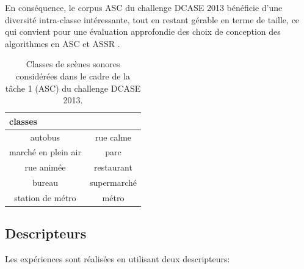 En conséquence, le corpus ASC du challenge DCASE 2013 bénéficie d'une diversité intra-classe intéressante, tout en restant gérable en terme de taille, ce qui convient pour une évaluation approfondie des choix de conception des algorithmes en ASC et ASSR \citep{lagrange2015bag}.

\begin{table}[t]
\centering
\begin{tabular}{cc}
\multicolumn{2}{l}{classes} \\
\hline 
autobus             & rue calme \\ 
marché en plein air & parc            \\                      
rue animée          & restaurant \\ 
bureau              & supermarché \\ 
station de métro    & métro \\ 
\hline
\end{tabular}
\vspace{0.5mm}
\caption{Classes de scènes sonores considérées dans le cadre de la tâche 1 (ASC) du challenge DCASE 2013.}
\label{tab:classASCDcase2013}
\end{table}

\subsection{Descripteurs}

Les expériences sont réalisées en utilisant deux descripteurs:

